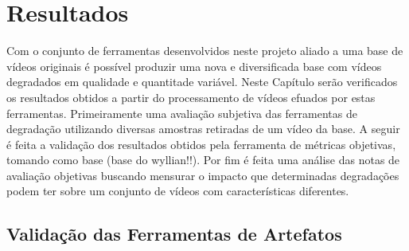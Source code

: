 
\chapter{Resultados} %

Com o conjunto de ferramentas desenvolvidos neste projeto aliado a uma base de vídeos originais é possível produzir uma nova e diversificada base com vídeos degradados em qualidade e quantitade variável.
Neste Capítulo serão verificados os resultados obtidos a partir do processamento de vídeos efuados por estas ferramentas. Primeiramente uma avaliação subjetiva das ferramentas de degradação utilizando diversas amostras retiradas de um vídeo da base. A seguir é feita a validação dos resultados obtidos pela ferramenta de métricas objetivas, tomando como base (base do wyllian!!).
Por fim é feita uma análise das notas de avaliação objetivas buscando mensurar o impacto que determinadas degradações podem ter sobre um conjunto de vídeos com características diferentes.

\section{Validação das Ferramentas de Artefatos}


